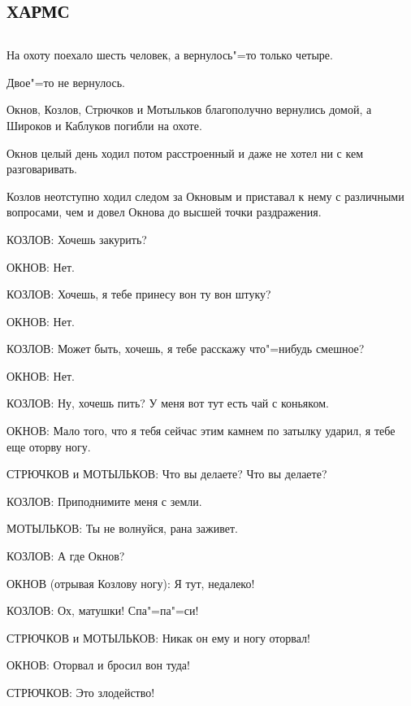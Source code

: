 \documentclass{article}
\begin{document}
\begin{center}\section*{\textbf{ ХАРМС}}

\subsection*{\textbf{}}\end{center}
\small

На охоту поехало шесть человек, а вернулось"=то только четыре.

Двое"=то не вернулось.

Окнов, Козлов, Стрючков и Мотыльков благополучно вернулись домой, а Широков и Каблуков погибли на охоте.

Окнов целый день  ходил потом расстроенный и даже не хотел ни с кем  разговаривать.

Козлов неотступно ходил следом за Окновым и приставал к нему с различными вопросами, чем и довел Окнова до высшей точки раздражения.

КОЗЛОВ: Хочешь закурить?

ОКНОВ: Нет.

КОЗЛОВ: Хочешь, я тебе принесу вон ту вон штуку?

ОКНОВ: Нет.

КОЗЛОВ:  Может быть, хочешь, я тебе расскажу что"=нибудь смешное?

ОКНОВ: Нет.
    
КОЗЛОВ: Ну, хочешь пить? У меня вот тут есть чай с коньяком.
    
ОКНОВ: Мало того, что я тебя сейчас этим камнем по затылку ударил, я тебе еще оторву ногу.

СТРЮЧКОВ  и  МОТЫЛЬКОВ: Что вы делаете? Что вы делаете?
    
КОЗЛОВ: Приподнимите меня с земли.
    
МОТЫЛЬКОВ: Ты не волнуйся, рана заживет.
    
КОЗЛОВ: А где Окнов?
    
ОКНОВ (отрывая Козлову ногу): Я тут, недалеко!
    
КОЗЛОВ: Ох, матушки! Спа"=па"=си!
    
СТРЮЧКОВ и МОТЫЛЬКОВ: Никак он ему и ногу оторвал!
    
ОКНОВ: Оторвал и бросил вон туда!
    
СТРЮЧКОВ: Это злодейство!
    
\end{document}
